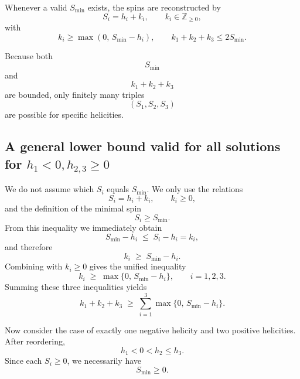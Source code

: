 \documentclass[12pt]{article}
\begin{document}
\vspace*{1em}
Whenever a valid $S_{\min}$ exists, the spins are reconstructed by
\begin{equation}
S_i = h_i + k_i,
\qquad
k_i\in\mathbb Z_{\ge0},
\end{equation}
with
\begin{equation}
k_i \ge \max(0,\,S_{\min}-h_i),
\qquad
k_1+k_2+k_3 \le 2 S_{\min}.
\end{equation}

Because both $$S_{\min}$$ and $$k_1+k_2+k_3$$ are bounded, only finitely many triples $$(S_1,S_2,S_3)$$ are possible for specific helicities.

\subsection{A general lower bound valid for all solutions for $h_1<0,h_{2,3}\ge 0$}
We do not assume which $S_i$ equals $S_{\min}$.  We only use the relations
\begin{equation}
S_i = h_i + k_i, \qquad k_i \ge 0,
\end{equation}
and the definition of the minimal spin
\begin{equation}
S_i \ge S_{\min}.
\end{equation}
From this inequality we immediately obtain
\begin{equation}
S_{\min} - h_i \;\le\; S_i - h_i = k_i,
\end{equation}
and therefore
\begin{equation}
k_i \;\ge\; S_{\min} - h_i.
\end{equation}
Combining with $k_i \ge 0$ gives the unified inequality
\begin{equation}
k_i \;\ge\; \max\{0,\, S_{\min}-h_i\},
\qquad i=1,2,3.
\end{equation}
Summing these three inequalities yields
\begin{equation}
k_1 + k_2 + k_3 
\;\ge\; 
\sum_{i=1}^3 \max\{0,\, S_{\min}-h_i\}.
\end{equation}

Now consider the case of exactly one negative helicity and two positive helicities.
After reordering,
\begin{equation}
h_1 < 0 < h_2 \le h_3.
\end{equation}
Since each $S_i \ge 0$, we necessarily have
\begin{equation}
S_{\min} \ge 0.
\end{equation}
\end{document}

